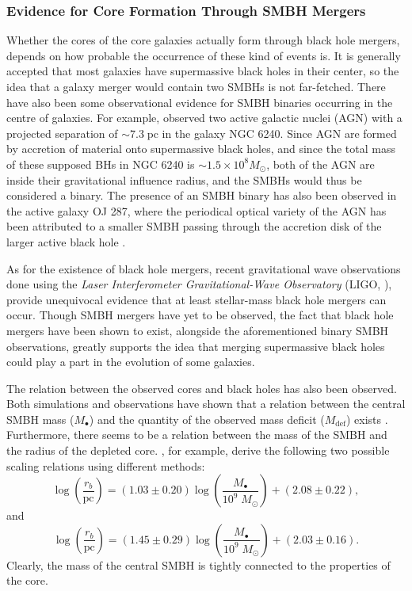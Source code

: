 \documentclass[english, oneside]{HYgradu}
\begin{document}
\subsubsection{Evidence for Core Formation Through SMBH Mergers}

Whether the cores of the core galaxies actually form through black hole mergers, depends on how probable the occurrence of these kind of events is. It is generally accepted that most galaxies have supermassive black holes in their center, so the idea that a galaxy merger would contain two SMBHs is not far-fetched. There have also been some observational evidence for SMBH binaries occurring in the centre of galaxies. For example, \cite{Rodriguez2006} observed two active galactic nuclei (AGN) with a projected separation of $\sim 7.3 \; \mathrm{pc}$ in the galaxy NGC 6240. Since AGN are formed by accretion of material onto supermassive black holes, and since the total mass of these supposed BHs in NGC 6240 is $\sim 1.5 \times 10^8 M_\odot$, both of the AGN are inside their gravitational influence radius, and the SMBHs would thus be considered a binary. The presence of an SMBH binary has also been observed in the active galaxy OJ 287, where the periodical optical variety of the AGN has been attributed to a smaller SMBH passing through the accretion disk of the larger active black hole \citep{MerrittBook}.

As for the existence of black hole mergers, recent gravitational wave observations done using the \textit{Laser Interferometer Gravitational-Wave Observatory} (LIGO, \citealt{Abbott2016, Abbott2019}), provide unequivocal evidence that at least stellar-mass black hole mergers can occur. Though SMBH mergers have yet to be observed, the fact that black hole mergers have been shown to exist, alongside the aforementioned binary SMBH observations, greatly supports the idea that merging supermassive black holes could play a part in the evolution of some galaxies.

The relation between the observed cores and black holes has also been observed. Both simulations and observations have shown that a relation between the central SMBH mass ($M_\bullet$) and the quantity of the observed mass deficit ($M_\mathrm{def}$) exists \citep{Graham2004, Merritt2006, Dullo2014}. Furthermore, there seems to be a relation between the mass of the SMBH and the radius of the depleted core. \cite{Dullo2012}, for example, derive the following two possible scaling relations using different methods:
\begin{equation}
\log \left( \frac{r_b}{\mathrm{pc}} \right) = (1.03 \pm 0.20) \log \left( \frac{M_\bullet}{10^9 \; M_\odot} \right) + (2.08 \pm 0.22),
\end{equation}
and
\begin{equation}
\log \left( \frac{r_b}{\mathrm{pc}} \right) = (1.45 \pm 0.29) \log \left( \frac{M_\bullet}{10^9 \; M_\odot} \right) + (2.03 \pm 0.16).
\end{equation}
Clearly, the mass of the central SMBH is tightly connected to the properties of the core.
\end{document}
